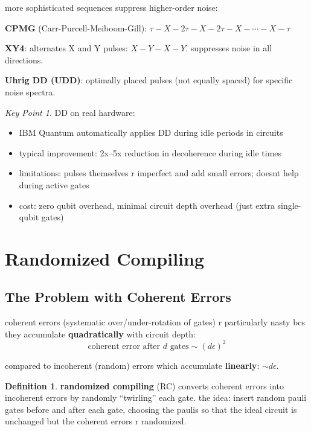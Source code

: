\documentclass[11pt,a4paper]{article}
\theoremstyle{definition}
\newtheorem{definition}{Definition}[section]
\theoremstyle{remark}
\newtheorem*{keypoint}{Key Point}
\begin{document}
more sophisticated sequences suppress higher-order noise:

\textbf{CPMG} (Carr-Purcell-Meiboom-Gill): $\tau - X - 2\tau - X - 2\tau - X - \cdots - X - \tau$

\textbf{XY4}: alternates X and Y pulses: $X - Y - X - Y$. suppresses noise in all directions.

\textbf{Uhrig DD (UDD)}: optimally placed pulses (not equally spaced) for specific noise spectra.

\begin{keypoint}
DD on real hardware:
\begin{itemize}
    \item IBM Quantum automatically applies DD during idle periods in circuits
    \item typical improvement: 2x--5x reduction in decoherence during idle times
    \item limitations: pulses themselves r imperfect and add small errors; doesnt help during active gates
    \item cost: zero qubit overhead, minimal circuit depth overhead (just extra single-qubit gates)
\end{itemize}
\end{keypoint}

\section{Randomized Compiling}

\subsection{The Problem with Coherent Errors}

coherent errors (systematic over/under-rotation of gates) r particularly nasty bcs they accumulate \textbf{quadratically} with circuit depth:
\[
\text{coherent error after } d \text{ gates} \sim (d\epsilon)^2
\]

compared to incoherent (random) errors which accumulate \textbf{linearly}: $\sim d\epsilon$.

\begin{definition}
\textbf{randomized compiling} (RC) converts coherent errors into incoherent errors by randomly ``twirling'' each gate. the idea: insert random pauli gates before and after each gate, choosing the paulis so that the ideal circuit is unchanged but the coherent errors r randomized.
\end{definition}
\end{document}
